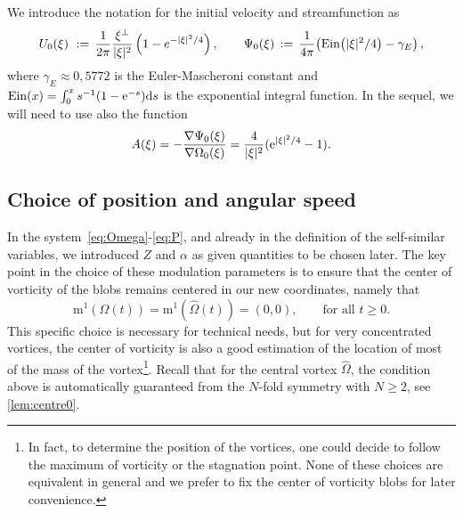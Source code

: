 \documentclass[11pt,reqno,a4paper]{amsart}
\def\dd{{\rm d}}
\def\e{{\rm e}}
\newcommand{\Ein}{\mathrm{Ein}}
\newcommand{\mrm}{\mathrm{m}}
\newcommand{\1}{\mathbbm{1}}
\theoremstyle{definition}
\theoremstyle{definition}
\numberwithin{equation}{section}
\begin{document}
We  introduce the notation for the initial velocity and streamfunction as
\begin{equation}\label{def:UG}
  U_0(\xi) \, \,:=\, \frac{1}{2\pi}
  \frac{\xi^\perp}{|\xi|^2}\,\Bigl(1-e^{-|\xi|^2/4}\Bigr)\,, \qquad
  \Psi_0(\xi) \, := \,\frac{1}{4\pi}\big(\Ein\bigl(|\xi|^2/4\bigr) -
  \gamma_E\big)\,,
\end{equation}
where $\gamma_E\approx 0,5772$ is the Euler-Mascheroni constant and ${\rm Ein}(x)=\int_0^xs^{-1}(1-\e^{-s}) \dd s$ is the exponential integral function. In the sequel, we will need to use also the function 
\begin{equation}
    \label{def:A}
    A(\xi)=-\frac{\nabla \Psi_0(\xi)}{\nabla \Omega_0(\xi)}=\frac{4}{|\xi|^2}(\e^{|\xi|^2/4}-1).
\end{equation}

\subsection{Choice of position and angular speed}
In the system~\cref{eq:Omega}-\cref{eq:P}, and already in the definition of the self-similar variables, we introduced $Z$ and $\alpha$ as given quantities to be chosen later. 
The key point in the choice of these modulation parameters is to ensure that the center of vorticity of the blobs remains centered in our new coordinates, namely that
\begin{equation}
    \mrm^1(\Omega(t))=\mrm^1(\widehat{\Omega}(t))=(0,0), \qquad \text{for all } t\geq0.
\end{equation}
This specific choice is necessary for technical needs, but for very concentrated vortices, the center of vorticity is also a good estimation of the location of most of the mass of the vortex\footnote{In fact, to determine the position of the vortices, one could decide to follow the maximum of vorticity or the stagnation point. None of these choices are equivalent in general and we prefer to fix the center of vorticity blobs for later convenience.}. Recall that for the central vortex $\widehat{\Omega}$, the condition above is automatically guaranteed from the $N$-fold symmetry with $N\geq2$, see \cref{lem:centre0}. 
\end{document}
